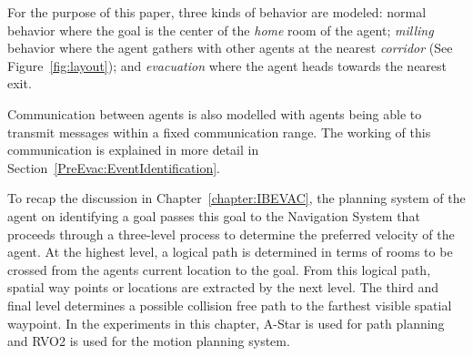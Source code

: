 

For the purpose of this paper, three kinds of behavior are modeled: normal behavior where the goal is the center of the \emph{home} room of the agent; \emph{milling} behavior where the agent gathers with other agents at the nearest \emph{corridor} (See Figure~\ref{fig:layout}); and \emph{evacuation} where the agent heads towards the nearest exit.

Communication between agents is also modelled with agents being able to transmit messages within a fixed communication range. The working of this communication is explained in more detail in Section~\ref{PreEvac:EventIdentification}.

To recap the discussion in Chapter~\ref{chapter:IBEVAC}, the planning system of the agent on identifying a goal passes this goal to the Navigation System that proceeds through a three-level process to determine the preferred velocity of the agent. At the highest level, a logical path is determined in terms of rooms to be crossed from the agents current location to the goal. From this logical path, spatial way points or locations are extracted by the next level. The third and final level determines a possible collision free path to the farthest visible spatial waypoint. In the experiments in this chapter, A-Star is used for path planning and RVO2 is used for the motion planning system.

